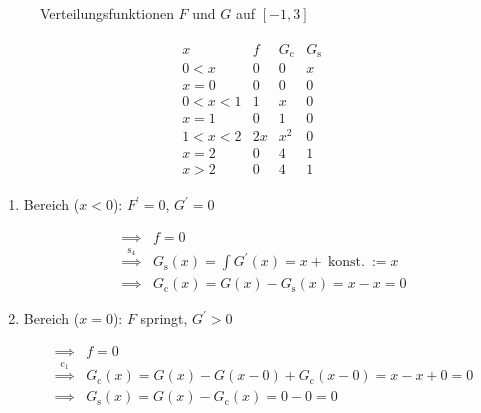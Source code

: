 \begin{solution}
\begin{figure}[H]
    \centering
    \hfill
    \caption{Verteilungsfunktionen $F$ und $G$ auf $[-1, 3]$}
    \label{fig:verteilungsfunktionen}
\end{figure}

\begin{align*}
    \begin{array}{c|c|c|c}
        x         & f   & G_\mathrm{c} & G_\mathrm{s} \\ \hline
        0 < x     & 0   & 0   & x   \\ \hline
        x = 0     & 0   & 0   & 0   \\ \hline
        0 < x < 1 & 1   & x   & 0   \\ \hline
        x = 1     & 0   & 1   & 0   \\ \hline
        1 < x < 2 & 2 x & x^2 & 0   \\ \hline
        x = 2     & 0   & 4   & 1   \\ \hline
        x > 2     & 0   & 4   & 1
    \end{array}
\end{align*}

\begin{enumerate}[label = \arabic*.]

    \item Bereich ($x < 0$):
    $F^\prime = 0$, $G^\prime = 0$

    \begin{align*}
        \implies & f = 0 \\
        \stackrel{\mathrm s_4}{\implies} & G_\mathrm{s}(x) = \int G^\prime(x) = x + ~\text{konst.}~ := x \\
        \implies & G_\mathrm{c}(x) = G(x) - G_\mathrm{s}(x) = x - x = 0
    \end{align*}

    \item Bereich ($x = 0$):
    $F$ springt, $G^\prime > 0$

    \begin{align*}
        \implies & f = 0 \\
        \stackrel{\mathrm c_1}{\implies} & G_\mathrm{c}(x) = G(x) - G(x - 0) + G_\mathrm{c}(x - 0) = x - x + 0 = 0 \\
        \implies & G_\mathrm{s}(x) = G(x) - G_\mathrm{c}(x) = 0 - 0 = 0
    \end{align*}


\end{enumerate}
\end{solution}
